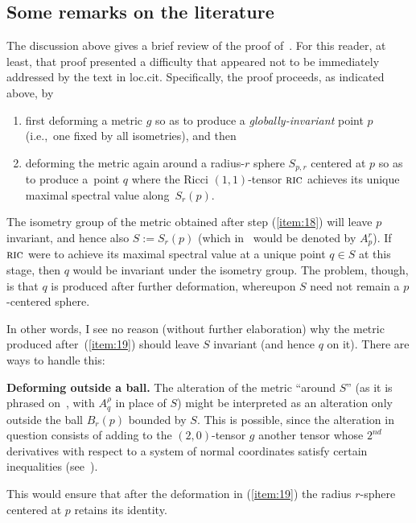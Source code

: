 \documentclass[pdftex]{sigma}%
\numberwithin{equation}{section}
\newcommand{\cat}[1]{\textsc{#1}}
\begin{document}
\subsection{Some remarks on the literature}%

The discussion above gives a brief review of the proof of~\cite[Proposition~8.3]{eb}. For this reader, at least, that proof presented a difficulty that appeared not to be immediately addressed by the text in loc.cit. Specifically, the proof proceeds, as indicated above, by
\begin{enumerate}[(1)]\itemsep=0pt
\item\label{item:18} first deforming a metric $g$ so as to produce a {\it globally-invariant} point $p$ (i.e.,~one fixed by all isometries), and then
\item\label{item:19} deforming the metric again around a radius-$r$ sphere $S_{p,r}$ centered at $p$ so as to produce a~point $q$ where the Ricci $(1,1)$-tensor $\cat{ric}$ achieves its unique maximal spectral value along~$S_r(p)$.
\end{enumerate}

The isometry group of the metric obtained after step (\ref{item:18}) will leave $p$ invariant, and hence also $S:=S_r(p)$ (which in~\cite{eb} would be denoted by $A_p^r$). If $\cat{ric}$ were to achieve its maximal spectral value at a unique point $q\in S$ at this stage, then $q$ would be invariant under the isometry group. The problem, though, is that $q$ is produced after further deformation, whereupon $S$ need not remain a $p$-centered sphere.

In other words, I see no reason (without further elaboration) why the metric produced after~(\ref{item:19}) should leave $S$ invariant (and hence $q$ on it). There are ways to handle this:
\medskip

{\bf Deforming outside a ball.} The alteration of the metric ``around $S$'' (as it is phrased on~\cite[p.~36]{eb}, with $A_q^{\rho}$ in place of $S$) might be interpreted as an alteration only outside the ball $B_r(p)$ bounded by $S$. This is possible, since the alteration in question consists of adding to the $(2,0)$-tensor $g$ another tensor whose $2^{nd}$ derivatives with respect to a system of normal coordinates satisfy certain inequalities (see~\cite[equation (8.4)]{eb}).

This would ensure that after the deformation in (\ref{item:19}) the radius $r$-sphere centered at $p$ retains its identity.
\end{document}
